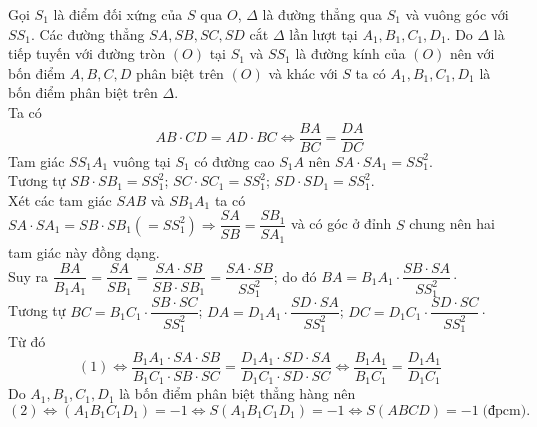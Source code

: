 \begin{bt}
{\begin{center}
\end{center}
\noindent
Gọi $S_1$ là điểm đối xứng của $S$ qua $O$, $\Delta$ là đường thẳng qua $S_1$ và vuông góc với $SS_1$. Các đường thẳng $SA, SB, SC, SD$ cắt $\Delta$ lần lượt tại $A_1, B_1, C_1, D_1$. Do $\Delta$ là tiếp tuyến với đường tròn $(O)$ tại $S_1$ và $SS_1$ là đường kính của $(O)$ nên với bốn điểm $A, B, C, D$ phân biệt trên $(O)$ và khác với $S$ ta có $A_1, B_1, C_1, D_1$ là bốn điểm phân biệt trên $\Delta$.\\
Ta có \[AB\cdot CD=AD \cdot BC \Leftrightarrow \dfrac{BA}{BC}=\dfrac{DA}{DC} \tag{1}\]
\noindent Tam giác $SS_1A_1$ vuông tại $S_1$ có đường cao $S_1A$ nên $SA\cdot SA_1=SS^2_1$.\\ Tương tự $SB\cdot SB_1=SS^2_1$; $SC\cdot SC_1=SS^2_1$; $SD\cdot SD_1=SS^2_1.$ \\
Xét các tam giác $SAB$ và $SB_1A_1$ ta có $SA\cdot SA_1=SB\cdot SB_1(=SS^2_1)\Rightarrow \dfrac{SA}{SB}=\dfrac{SB_1}{SA_1}$ và có góc ở đỉnh $S$ chung nên hai tam giác này đồng dạng. \\ Suy ra $\dfrac{BA}{B_1A_1}=\dfrac{SA}{SB_1}=\dfrac{SA\cdot SB}{SB\cdot SB_1}=\dfrac{SA\cdot SB}{SS^2_1}$; do đó $BA=B_1A_1\cdot \dfrac{SB\cdot SA}{SS^2_1}\cdot$\\
Tương tự $BC=B_1C_1\cdot \dfrac{SB\cdot SC}{SS^2_1}$; $DA=D_1A_1\cdot \dfrac{SD\cdot SA}{SS^2_1}$; $DC=D_1C_1\cdot \dfrac{SD\cdot SC}{SS^2_1}\cdot$\\ Từ đó \[(1)\Leftrightarrow \dfrac{B_1A_1\cdot SA\cdot SB}{B_1C_1\cdot SB\cdot SC}=\dfrac{D_1A_1\cdot SD\cdot SA}{D_1C_1\cdot SD\cdot SC}\Leftrightarrow \dfrac{B_1A_1}{B_1C_1}=\dfrac{D_1A_1}{D_1C_1} \tag{2}\]
Do $A_1, B_1, C_1, D_1$ là bốn điểm phân biệt thẳng hàng nên \[(2)\Leftrightarrow (A_1B_1C_1D_1)=-1 \Leftrightarrow S(A_1B_1C_1D_1)=-1
\Leftrightarrow S(ABCD)=-1\;\text{(đpcm).}\]}
\begin{nx}

\end{nx}
\end{bt}
